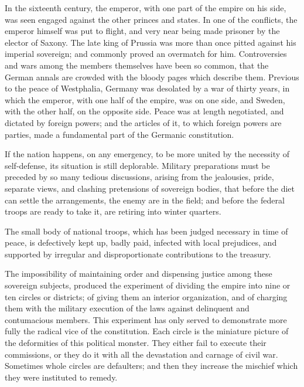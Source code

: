 In the sixteenth century, the emperor, with one part of the empire on his side, was seen engaged against the other princes and states. In one of the conflicts, the emperor himself was put to flight, and very near being made prisoner by the elector of Saxony. The late king of Prussia was more than once pitted against his imperial sovereign; and commonly proved an overmatch for him. Controversies and wars among the members themselves have been so common, that the German annals are crowded with the bloody pages which describe them. Previous to the peace of Westphalia, Germany was desolated by a war of thirty years, in which the emperor, with one half of the empire, was on one side, and Sweden, with the other half, on the opposite side. Peace was at length negotiated, and dictated by foreign powers; and the articles of it, to which foreign powers are parties, made a fundamental part of the Germanic constitution.

If the nation happens, on any emergency, to be more united by the necessity of self-defense, its situation is still deplorable. Military preparations must be preceded by so many tedious discussions, arising from the jealousies, pride, separate views, and clashing pretensions of sovereign bodies, that before the diet can settle the arrangements, the enemy are in the field; and before the federal troops are ready to take it, are retiring into winter quarters.

The small body of national troops, which has been judged necessary in time of peace, is defectively kept up, badly paid, infected with local prejudices, and supported by irregular and disproportionate contributions to the treasury.

The impossibility of maintaining order and dispensing justice among these sovereign subjects, produced the experiment of dividing the empire into nine or ten circles or districts; of giving them an interior organization, and of charging them with the military execution of the laws against delinquent and contumacious members. This experiment has only served to demonstrate more fully the radical vice of the constitution. Each circle is the miniature picture of the deformities of this political monster. They either fail to execute their commissions, or they do it with all the devastation and carnage of civil war. Sometimes whole circles are defaulters; and then they increase the mischief which they were instituted to remedy.

